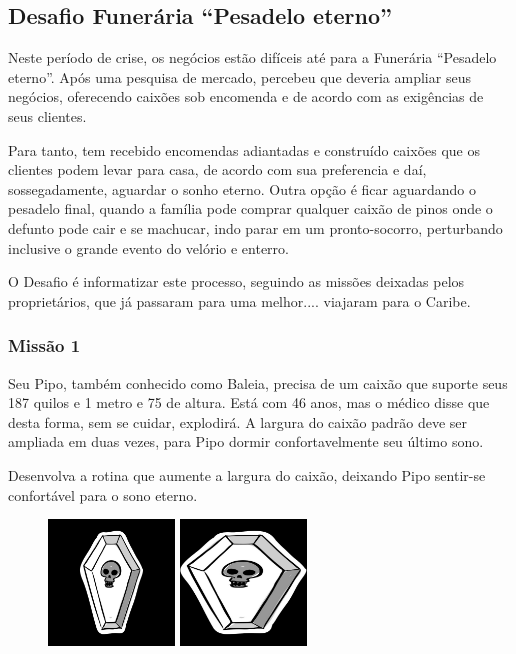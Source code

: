 \documentclass[
	12pt,				%
	oneside,			%
	a4paper,			%
	english,			%
	french,				%
	spanish,			%
	brazil,				%
	]{abntex2}
\begin{document}
\begin{apendicesenv}
\chapter{Desafio Funerária “Pesadelo eterno”}
\label{apen:transformacaoGeometrica}

Neste período de crise, os negócios estão difíceis até para a Funerária “Pesadelo eterno”. Após uma pesquisa de mercado, percebeu que deveria ampliar seus negócios, oferecendo caixões sob encomenda e de acordo com as exigências de seus clientes.

Para tanto, tem recebido encomendas adiantadas e construído caixões que os clientes podem levar para casa, de acordo com sua preferencia e daí, sossegadamente, aguardar o sonho eterno. Outra opção é ficar aguardando o pesadelo final, quando a família pode comprar qualquer caixão de pinos onde o defunto pode cair e se machucar, indo parar em um pronto-socorro, perturbando inclusive o grande evento do velório e enterro.

O Desafio é informatizar este processo, seguindo as missões deixadas pelos proprietários, que já passaram para uma melhor.... viajaram para o Caribe.

\subsection{Missão 1}

Seu Pipo, também conhecido como Baleia, precisa de um caixão que suporte seus 187 quilos e 1 metro e 75 de altura. Está com 46 anos, mas o médico disse que desta forma, sem se cuidar, explodirá. A largura do caixão padrão deve ser ampliada em duas vezes, para Pipo dormir confortavelmente seu último sono.

Desenvolva a rotina que aumente a largura do caixão, deixando Pipo sentir-se confortável para o sono eterno.

\begin{figure}[ht]
\centering
\includegraphics[width=0.3\textwidth]{imagens/desafios/coffin2dcenter.jpg}
\includegraphics[width=0.3\textwidth]{imagens/desafios/mission1.png}
\end{figure}


\end{apendicesenv}
\end{document}
